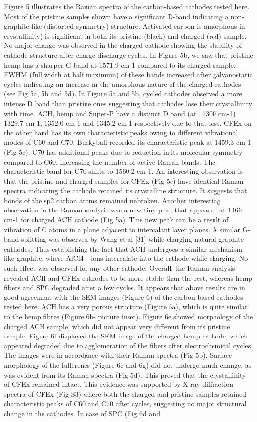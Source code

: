 \documentclass{article}
\begin{document}
Figure 5 illustrates the Raman spectra of the carbon-based cathodes tested here. Most of the pristine samples shown have a significant D-band indicating a non-graphite-like (distorted symmetry) structure.  Activated carbon is amorphous in crystallinity) is significant in both its pristine (black) and charged (red) sample. No major change was observed in the charged cathode showing the stability of cathode structure after charge-discharge cycles. In Figure 5b, we saw that pristine hemp has a sharper G band at 1571.9 cm-1 compared to its charged sample. FWHM (full width at half maximum) of these bands increased after galvanostatic cycles indicating an increase in the amorphous nature of the charged cathodes (see Fig 5a, 5b and 5d). In Figure 5a and 5b, cycled cathodes observed a more intense D band than pristine ones suggesting that cathodes lose their crystallinity with time. ACH, hemp and Super-P have a distinct D band (at ~1300 cm-1) 1329.7 cm-1, 1352.0 cm-1 and 1345.2 cm-1 respectively due to that loss. CFEx on the other hand has its own characteristic peaks owing to different vibrational modes of C60 and C70. Buckyball recorded its characteristic peak at 1459.3 cm-1 (Fig 5c). C70 has additional peaks due to reduction in its molecular symmetry compared to C60, increasing the number of active Raman bands. The characteristic band for C70 shifts to 1560.2 cm-1. An interesting observation is that the pristine and charged samples for CFEx (Fig 5c) have identical Raman spectra indicating the cathode retained its crystalline structure. It suggests that bonds of the sp2 carbon atoms remained unbroken. Another interesting observation in the Raman analysis was a new tiny peak that appeared at 1466 cm-1 for charged ACH cathode (Fig 5a). This new peak can be a result of vibration of C atoms in a plane adjacent to intercalant layer planes. A similar G-band splitting was observed by Wang et al [31] while charging natural graphite cathodes. Thus establishing the fact that ACH undergoes a similar mechanism like graphite, where AlCl4− ions intercalate into the cathode while charging. No such effect was observed for any other cathode. Overall, the Raman analysis revealed ACH and CFEx cathodes to be more stable than the rest, whereas hemp fibers and SPC degraded after a few cycles. It appears that above results are in good agreement with the SEM images (Figure 6) of the carbon-based cathodes tested here. ACH has a very porous structure (Figure 5a), which is quite similar to the hemp fibres (Figure 6b- picture inset). Figure 6e showed morphology of the charged ACH sample, which did not appear very different from its pristine sample. Figure 6f displayed the SEM image of the charged hemp cathode, which appeared degraded due to agglomeration of the fibers after electrochemical cycles. The images were in accordance with their Raman spectra (Fig 5b). Surface morphology of the fullerenes (Figure 6c and 6g) did not undergo much change, as was evident from its Raman spectra (Fig 5d). This proved that the crystallinity of CFEx remained intact. This evidence was supported by X-ray diffraction spectra of CFEx (Fig S3) where both the charged and pristine samples retained characteristic peaks of C60 and C70 after cycles, suggesting no major structural change in the cathodes. In case of SPC (Fig 6d and 
\end{document}
